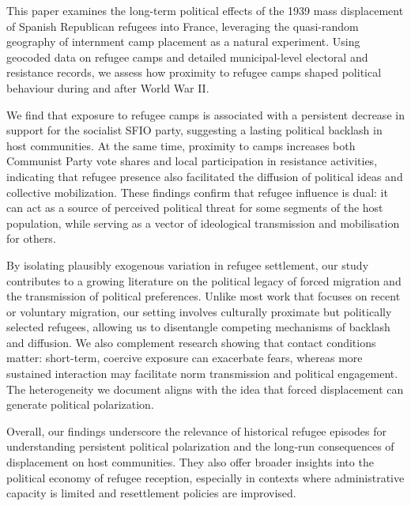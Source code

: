 This paper examines the long-term political effects of the 1939 mass displacement of Spanish Republican refugees into France, leveraging the quasi-random geography of internment camp placement as a natural experiment. Using geocoded data on refugee camps and detailed municipal-level electoral and resistance records, we assess how proximity to refugee camps shaped political behaviour during and after World War II.

We find that exposure to refugee camps is associated with a persistent decrease in support for the socialist SFIO party, suggesting a lasting political backlash in host communities. At the same time, proximity to camps increases both Communist Party vote shares and local participation in resistance activities, indicating that refugee presence also facilitated the diffusion of political ideas and collective mobilization. These findings confirm that refugee influence is dual: it can act as a source of perceived political threat for some segments of the host population, while serving as a vector of ideological transmission and mobilisation for others.

By isolating plausibly exogenous variation in refugee settlement, our study contributes to a growing literature on the political legacy of forced migration and the transmission of political preferences. Unlike most work that focuses on recent or voluntary migration, our setting involves culturally proximate but politically selected refugees, allowing us to disentangle competing mechanisms of backlash and diffusion. We also complement research showing that contact conditions matter: short-term, coercive exposure can exacerbate fears, whereas more sustained interaction may facilitate norm transmission and political engagement. The heterogeneity we document aligns with the idea that forced displacement can generate political polarization.

Overall, our findings underscore the relevance of historical refugee episodes for understanding persistent political polarization and the long-run consequences of displacement on host communities. They also offer broader insights into the political economy of refugee reception, especially in contexts where administrative capacity is limited and resettlement policies are improvised.

